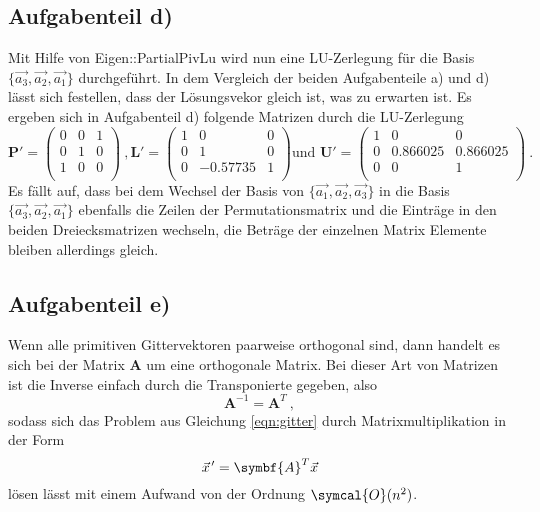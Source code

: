 \subsection*{Aufgabenteil d)}
Mit Hilfe von Eigen::PartialPivLu wird nun eine LU-Zerlegung für die Basis $\{\vec{a_3},\vec{a_2},\vec{a_1}\}$ durchgeführt. In dem Vergleich der beiden Aufgabenteile a) und d) lässt sich festellen, dass der Lösungsvekor gleich ist, was zu erwarten ist.
Es ergeben sich in Aufgabenteil d) folgende Matrizen durch die LU-Zerlegung
\begin{equation*}
  \symbf{P'}=
  \begin{pmatrix}
    0 & 0 & 1 \\
    0 & 1 & 0 \\
    1 & 0 & 0 \\
  \end{pmatrix} \: ,
  \symbf{L'}=
  \begin{pmatrix}
    1 & 0 & 0 \\
    0 & 1 & 0 \\
    0 & -0.57735 & 1 \\
  \end{pmatrix}
  \text{und }
  \symbf{U'}=
  \begin{pmatrix}
    1 & 0 & 0 \\
    0 & 0.866025 & 0.866025 \\
    0 & 0 & 1 \\
  \end{pmatrix} \: .
\end{equation*}
Es fällt auf, dass bei dem Wechsel der Basis von $\{\vec{a_1},\vec{a_2},\vec{a_3}\}$ in die Basis $\{\vec{a_3},\vec{a_2},\vec{a_1}\}$ ebenfalls die Zeilen der Permutationsmatrix und die Einträge in den beiden Dreiecksmatrizen wechseln, die Beträge der einzelnen Matrix Elemente bleiben allerdings gleich.

\subsection*{Aufgabenteil e)}

Wenn alle primitiven Gittervektoren paarweise orthogonal sind, dann handelt es sich bei der Matrix $\symbf{A}$  um eine orthogonale Matrix. Bei dieser Art von Matrizen ist die Inverse einfach durch die Transponierte gegeben, also
\begin{equation}
  \symbf{A}^{-1}=\symbf{A}^T \: ,
\end{equation}
sodass sich das Problem aus Gleichung \eqref{eqn:gitter} durch Matrixmultiplikation in der Form
\begin{equation}
  \pvec{x}'=\symbf{A}^T\vec{x}
\end{equation}
lösen lässt mit einem Aufwand von der Ordnung $\symcal{O}(n^2)$.



